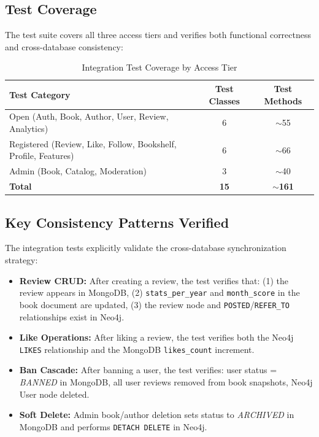 \subsection{Test Coverage}
The test suite covers all three access tiers and verifies both functional correctness and cross-database consistency:

\begin{table}[H]
    \centering
    \caption{Integration Test Coverage by Access Tier}
    \label{tab:test_coverage}
    \begin{tabular}{@{}p{}cc@{}}
        \toprule
        \textbf{Test Category} & \textbf{Test Classes} & \textbf{Test Methods} \\ \midrule
        Open (Auth, Book, Author, User, Review, Analytics) & 6 & $\sim$55 \\
        Registered (Review, Like, Follow, Bookshelf, Profile, Features) & 6 & $\sim$66 \\
        Admin (Book, Catalog, Moderation) & 3 & $\sim$40 \\
        \midrule
        \textbf{Total} & \textbf{15} & \textbf{$\sim$161} \\
        \bottomrule
    \end{tabular}
\end{table}

\subsection{Key Consistency Patterns Verified}
The integration tests explicitly validate the cross-database synchronization strategy:
\begin{itemize}
    \item \textbf{Review CRUD:} After creating a review, the test verifies that: (1) the review appears in MongoDB, (2) \texttt{stats\_per\_year} and \texttt{month\_score} in the book document are updated, (3) the review node and \texttt{POSTED}/\texttt{REFER\_TO} relationships exist in Neo4j.
    \item \textbf{Like Operations:} After liking a review, the test verifies both the Neo4j \texttt{LIKES} relationship and the MongoDB \texttt{likes\_count} increment.
    \item \textbf{Ban Cascade:} After banning a user, the test verifies: user status = \textit{BANNED} in MongoDB, all user reviews removed from book snapshots, Neo4j User node deleted.
    \item \textbf{Soft Delete:} Admin book/author deletion sets status to \textit{ARCHIVED} in MongoDB and performs \texttt{DETACH DELETE} in Neo4j.
\end{itemize}

